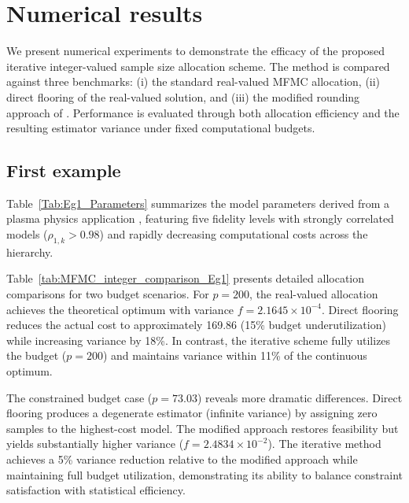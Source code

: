 \section{Numerical results}\label{sec:Num_Result}
We present numerical experiments to demonstrate the efficacy of the proposed iterative integer-valued sample size allocation scheme. The method is compared against three benchmarks: (i) the standard real-valued MFMC allocation, (ii) direct flooring of the real-valued solution, and (iii) the modified rounding approach of \cite{GrGuJuWa:2023}. Performance is evaluated through both allocation efficiency and the resulting estimator variance under fixed computational budgets.

\subsection{First example}
Table~\ref{Tab:Eg1_Parameters} summarizes the model parameters derived from a plasma physics application \cite{ElLiSa:2023,ElLiSa:2025}, featuring five fidelity levels with strongly correlated models ($\rho_{1,k} > 0.98$) and rapidly decreasing computational costs across the hierarchy.


Table~\ref{tab:MFMC_integer_comparison_Eg1} presents detailed allocation comparisons for two budget scenarios. For $p=200$, the real-valued allocation achieves the theoretical optimum with variance $f=2.1645\times10^{-4}$. Direct flooring reduces the actual cost to approximately 169.86 (15\% budget underutilization) while increasing variance by 18\%. In contrast, the iterative scheme fully utilizes the budget ($p=200$) and maintains variance within 11\% of the continuous optimum.


The constrained budget case ($p=73.03$) reveals more dramatic differences. Direct flooring produces a degenerate estimator (infinite variance) by assigning zero samples to the highest-cost model. The modified approach restores feasibility but yields substantially higher variance ($f=2.4834\times10^{-2}$). The iterative method achieves a 5\% variance reduction relative to the modified approach while maintaining full budget utilization, demonstrating its ability to balance constraint satisfaction with statistical efficiency.

%
\begin{table}[ht]
\centering
{}
\caption{Model parameters for the plasma physics example.}
\label{Tab:Eg1_Parameters}
\end{table}
%


